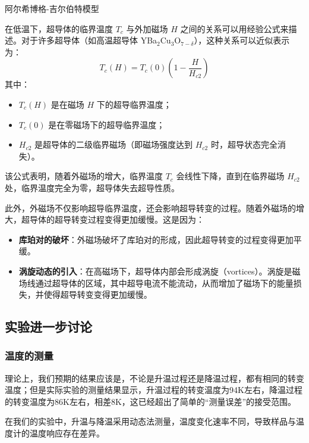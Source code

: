 阿尔希博格-吉尔伯特模型

在低温下，超导体的临界温度 $T_c$ 与外加磁场 $H$ 之间的关系可以用经验公式来描述。对于许多超导体（如高温超导体 YBa$_2$Cu$_3$O$_{7-\delta}$），这种关系可以近似表示为：
\[
T_c(H) = T_c(0) \left(1 - \frac{H}{H_{c2}}\right)
\]
其中：
\begin{itemize}
    \item $T_c(H)$ 是在磁场 $H$ 下的超导临界温度；
    \item $T_c(0)$ 是在零磁场下的超导临界温度；
    \item $H_{c2}$ 是超导体的二级临界磁场（即磁场强度达到 $H_{c2}$ 时，超导状态完全消失）。
\end{itemize}

该公式表明，随着外磁场的增大，临界温度 $T_c$ 会线性下降，直到在临界磁场 $H_{c2}$ 处，临界温度完全为零，超导体失去超导性质。

此外，外磁场不仅影响超导临界温度，还会影响超导转变的过程。随着外磁场的增大，超导体的超导转变过程变得更加缓慢。这是因为：
\begin{itemize}
    \item \textbf{库珀对的破坏}：外磁场破坏了库珀对的形成，因此超导转变的过程变得更加平缓。
    \item \textbf{涡旋动态的引入}：在高磁场下，超导体内部会形成涡旋（vortices）。涡旋是磁场线通过超导体的区域，其中超导电流不能流动，从而增加了磁场下的能量损失，并使得超导转变变得更加缓慢。
\end{itemize}


\subsection{实验进一步讨论}
\subsubsection{温度的测量}

理论上，我们预期的结果应该是，不论是升温过程还是降温过程，都有相同的转变温度；但是实际实验的测量结果显示，升温过程的转变温度为94K左右，降温过程的转变温度为86K左右，相差8K，这已经超出了简单的“测量误差”的接受范围。

在我们的实验中，升温与降温采用动态法测量，温度变化速率不同，导致样品与温度计的温度响应存在差异。

